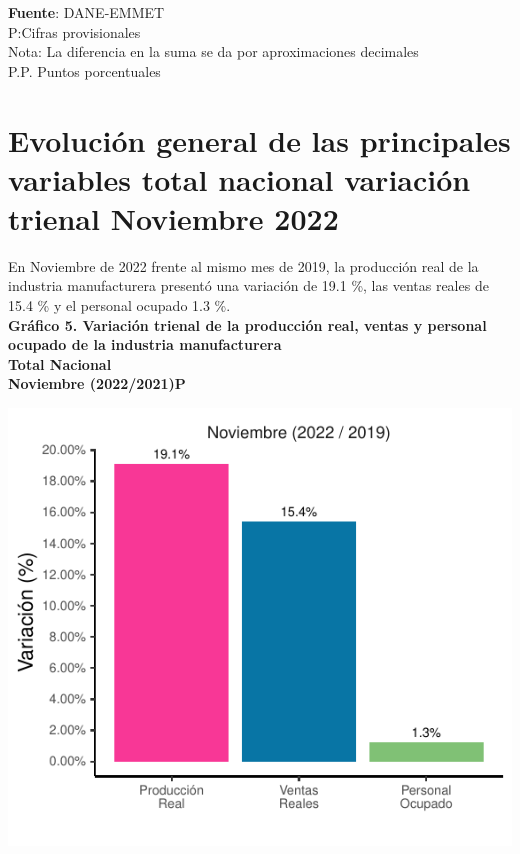 \documentclass[
]{article}
\begin{document}
\textbf{Fuente}: DANE-EMMET\\
P:Cifras provisionales\\
Nota: La diferencia en la suma se da por aproximaciones decimales\\
P.P. Puntos porcentuales\\

\hypertarget{evoluciuxf3n-general-de-las-principales-variables-total-nacional-variaciuxf3n-trienal-noviembre-2022}{%
\section{Evolución general de las principales variables total nacional
variación trienal Noviembre
2022}\label{evoluciuxf3n-general-de-las-principales-variables-total-nacional-variaciuxf3n-trienal-noviembre-2022}}

En Noviembre de 2022 frente al mismo mes de 2019, la producción real de
la industria manufacturera presentó una variación de 19.1 \%, las ventas
reales de 15.4 \% y el personal ocupado 1.3 \%.\\

\textbf{Gráfico 5. Variación trienal de la producción real, ventas y
personal ocupado de la industria manufacturera}\\
\textbf{Total Nacional}\\
\textbf{Noviembre (2022/2021)P}\\

\begin{center}\includegraphics{boletin_files/figure-latex/variacion_trienal_plot-1} \end{center}
\end{document}

